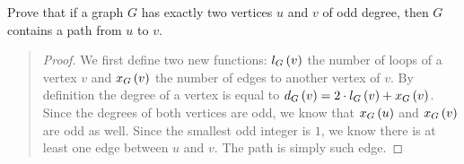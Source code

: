 \documentclass{article}
\begin{document}
\begin{exercise}
Prove that if a graph $G$ has exactly two vertices $u$ and $v$ of odd degree, then $G$ contains a path from $u$ to $v$.
\begin{answer}
\begin{quote}\begin{proof}
We first define two new functions: $l_G\left( v \right)$ the number of loops of a vertex $v$ and $x_G\left( v \right)$ the number of edges to another vertex of $v$. By definition the degree of a vertex is equal to $d_G\left( v \right)=2\cdot l_G\left( v \right)+x_G\left( v \right)$. Since the degrees of both vertices are odd, we know that $x_G\left( u \right)$ and $x_G\left( v \right)$ are odd as well. Since the smallest odd integer is $1$, we know there is at least one edge between $u$ and $v$. The path is simply such edge.
\end{proof}\end{quote}
\end{answer}
\end{exercise}
\end{document}

